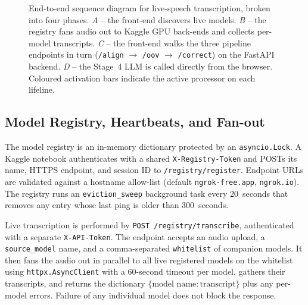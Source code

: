 \begin{figure}[H]
{}
    \caption[CORAL live-speech sequence diagram]{End-to-end sequence diagram for live-speech transcription, broken into four phases. \emph{A} -- the front-end discovers live models. \emph{B} -- the registry fans audio out to Kaggle GPU back-ends and collects per-model transcripts. \emph{C} -- the front-end walks the three pipeline endpoints in turn (\texttt{/align} $\rightarrow$ \texttt{/oov} $\rightarrow$ \texttt{/correct}) on the FastAPI backend. \emph{D} -- the Stage~4 LLM is called directly from the browser. Coloured activation bars indicate the active processor on each lifeline.}
    \label{fig:sequence-diagram}
\end{figure}

\subsection{Model Registry, Heartbeats, and Fan-out}
\label{ssec:registry}

The model registry is an in-memory dictionary protected by an \texttt{asyncio.Lock}. A Kaggle notebook authenticates with a shared \texttt{X-Registry-Token} and POSTs its name, HTTPS endpoint, and session ID to \texttt{/registry/register}. Endpoint URLs are validated against a hostname allow-list (default \texttt{ngrok-free.app}, \texttt{ngrok.io}). The registry runs an \texttt{eviction\_sweep} background task every 20~seconds that removes any entry whose last ping is older than 300~seconds.

Live transcription is performed by \texttt{POST /registry/transcribe}, authenticated with a separate \texttt{X-API-Token}. The endpoint accepts an audio upload, a \texttt{source\_model} name, and a comma-separated \texttt{whitelist} of companion models. It then fans the audio out in parallel to all live registered models on the whitelist using \texttt{httpx.AsyncClient} with a 60-second timeout per model, gathers their transcripts, and returns the dictionary $\{\text{model name}: \text{transcript}\}$ plus any per-model errors. Failure of any individual model does not block the response.


